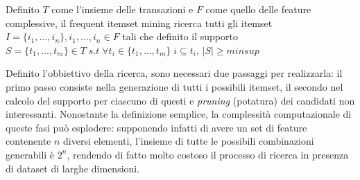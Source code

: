 \begin{definition}\label{definition:fim}
  Definito \(T\) come l'insieme delle transazioni e \(F\) come quello delle feature complessive,
  il frequent itemset mining ricerca tutti gli itemset \\
  \( I = \{ i_{1}, \ldots, i_{n}\}, i_{1}, \ldots, i_{n} \in F\)
  tali che definito il supporto \( S = \{ t_{1}, \ldots, t_{m} \} \in T \; s.t \; \forall t_{i} \in \{ t_{1}, \ldots, t_{m} \}
  \; i \subseteq t_{i}  \), \(|S| \geq minsup\)
\end{definition}

Definito l'obbiettivo della ricerca, sono necessari due passaggi per realizzarla:
il primo passo consiste nella generazione di tutti i possibili itemset, il secondo
nel calcolo del supporto per ciascuno di questi e \textit{pruning} (potatura) dei candidati
non interessanti.
Nonostante la definizione semplice, la complessità computazionale di queste fasi può esplodere:
supponendo infatti di avere un set di feature contenente \(n\) diversi elementi, l'insieme di tutte
le possibili combinazioni generabili è \(2^n\), rendendo di fatto molto costoso il processo
di ricerca in presenza di dataset di larghe dimensioni.

